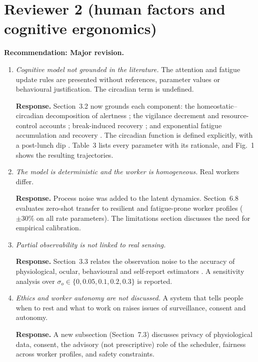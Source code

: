 \documentclass[11pt]{article}
\newcommand{\resp}[1]{\par\noindent\textbf{Response.} #1\par\medskip}
\begin{document}
\section{Reviewer 2 (human factors and cognitive ergonomics)}
\textbf{Recommendation: Major revision.}
\begin{enumerate}[label=R2.\arabic*]
\item \textit{Cognitive model not grounded in the literature.} The attention and fatigue update rules are presented without references, parameter values or behavioural justification. The circadian term is undefined.
\resp{Section~3.2 now grounds each component: the homeostatic--circadian decomposition of alertness \cite{borbely1982,akerstedt1997,borbely2016}; the vigilance decrement and resource-control accounts \cite{mackworth1948,warm2008,thomson2015}; break-induced recovery \cite{ariga2011,albulescu2022}; and exponential fatigue accumulation and recovery \cite{jaber2010,jaber2013}. The circadian function is defined explicitly, with a post-lunch dip \cite{monk2005,schmidt2007}. Table~3 lists every parameter with its rationale, and Fig.~1 shows the resulting trajectories.}
\item \textit{The model is deterministic and the worker is homogeneous.} Real workers differ.
\resp{Process noise was added to the latent dynamics. Section~6.8 evaluates zero-shot transfer to resilient and fatigue-prone worker profiles ($\pm30\%$ on all rate parameters). The limitations section discusses the need for empirical calibration.}
\item \textit{Partial observability is not linked to real sensing.}
\resp{Section~3.3 relates the observation noise to the accuracy of physiological, ocular, behavioural and self-report estimators \cite{charles2019,borghini2014,hogervorst2014,basner2011,hart1988}. A sensitivity analysis over $\sigma_o\in\{0,0.05,0.1,0.2,0.3\}$ is reported.}
\item \textit{Ethics and worker autonomy are not discussed.} A system that tells people when to rest and what to work on raises issues of surveillance, consent and autonomy.
\resp{A new subsection (Section~7.3) discusses privacy of physiological data, consent, the advisory (not prescriptive) role of the scheduler, fairness across worker profiles, and safety constraints.}
\end{enumerate}
\end{document}
